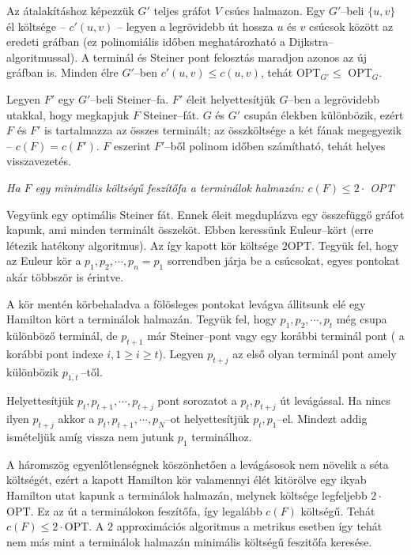 Az átalakításhoz képezzük $G'$ teljes gráfot $V$ csúcs halmazon. Egy $G'$--beli
$\{u,v\}$ él költsége -- $c'(u,v)$ -- legyen a legrövidebb út hossza $u$ és $v$
csúcsok között az eredeti gráfban (ez polinomiális időben meghatározható a
Dijkstra--algoritmussal). A terminál és Steiner pont felosztás maradjon azonos
az új gráfban is. Minden élre $G'$--ben $c'(u,v) \leq c(u,v)$, tehát OPT$_{G'}
\leq$ OPT$_{G}$.

Legyen $F'$ egy $G'$--beli Steiner--fa. $F'$ éleit helyettesítjük $G$--ben a
legrövidebb utakkal, hogy megkapjuk $F$ Steiner--fát. $G$ és $G'$ csupán élekben
különbözik, ezért $F$ és $F'$ is tartalmazza az összes terminált; az
összköltsége a két fának megegyezik -- $c(F)=c(F')$. $F$ eszerint $F'$--ből
polinom időben számítható, tehát helyes visszavezetés.

\vspace{0.4cm}
\emph{Ha $F$ egy minimális költségű feszítőfa a terminálok halmazán:  
$c(F) \leq  2 \cdot $ OPT}
\vspace{0.4cm}

Vegyünk egy optimális Steiner fát. Ennek éleit megduplázva egy összefüggő 
gráfot kapunk, ami minden terminált összeköt. Ebben keressünk Euleur--kört
(erre létezik hatékony algoritmus). Az így  kapott kör költsége $2$OPT. 
Tegyük fel, hogy az Euleur kör a $p_1, p_2, \cdots, p_n=p_1$ sorrendben járja 
be a csúcsokat, egyes pontokat akár többször is érintve.

A kör mentén körbehaladva a fölösleges pontokat levágva állitsunk elé egy
Hamilton kört a terminálok halmazán. Tegyük fel, hogy $p_1, p_2, \cdots, p_t$
még csupa különböző terminál, de $p_{t+1}$ már Steiner--pont vagy egy korábbi
terminál pont ( a korábbi pont indexe $i, 1 \geq i \geq t$). Legyen $p_{t+j}$ az
első olyan terminál pont amely különbözik $p_{\overline{1,t}}~$--től.

Helyettesítjük $p_t, p_{t+1}, \cdots, p_{t+j}$ pont sorozatot a $p_t, p_{t+j}$
út levágással. Ha nincs ilyen $p_{t+j}$ akkor a $p_t, p_{t+1}, \cdots, p_N$--ot
helyettesítjük $p_t,p_1$--el. Mindezt addig ismételjük amíg vissza nem jutunk
$p_1$ terminálhoz. 

A háromszög egyenlőtlenségnek köszönhetően a levágásosok nem növelik a séta
költségét, ezért a kapott Hamilton kör valamennyi élét kitörölve egy ikyab
Hamilton utat kapunk a terminálok halmazán, melynek költsége legfeljebb
$2\cdot$OPT. Ez az út a terminálokon feszítőfa, így legalább $c(F)$ költségű.
Tehát $c(F) \leq 2 \cdot$OPT. A $2$ approximációs algoritmus a metrikus esetben
így tehát nem más mint a terminálok halmazán minimális költségű feszitőfa
keresése.


